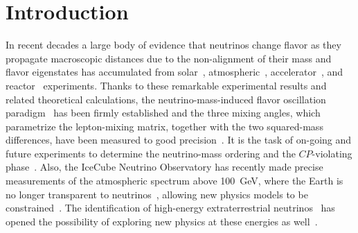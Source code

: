 \documentclass[3p,12pt]{elsarticle}
\newcounter{bla}
\begin{document}
\hypersetup{linkcolor=black}
\tableofcontents
\hypersetup{linkcolor=blue}
\newpage

\ifdefined\manualonly
\else %
\section{Introduction}
\label{sec:intro} 

In recent decades a large body of evidence that neutrinos change
flavor as they propagate macroscopic distances due to the
non-alignment of their mass and flavor eigenstates has accumulated from
solar~\citep{Super-Kamiokande:2010tar, Borexino:2013zhu},
atmospheric~\citep{PhysRevD.91.072004,Super-Kamiokande:2015qek,IceCube:2019dqi,ANTARES:2018rtf},
accelerator~\citep{PhysRevLett.112.181801,
  PhysRevD.93.051104,PhysRevLett.116.151806, PhysRevLett.110.251801}, and
reactor~\citep{An:2013zwz,Abe:2015rcp, Kim:2016yvm} experiments.
Thanks to these remarkable
experimental results and related theoretical calculations, the
  neutrino-mass-induced flavor oscillation paradigm~\citep{Pontecorvo:1967fh,Gribov:1968kq,fukugita2003physics,
  Akhmedov:1999uz,Balantekin:2013kc, GonzalezGarcia:2007ib,Mohapatra:qv, Gouvea:2013fj}
has been firmly established and the three mixing angles, which
parametrize the lepton-mixing matrix, together with the two
squared-mass differences, have been measured to good
precision~\citep{Esteban:2020cvm,deSalas:2017kay,Capozzi:2018ubv,deSalas:2020pgw}. It
is the task of on-going 
and future experiments to determine the neutrino-mass ordering 
and the $CP$-violating phase~\citep{Hewett:2012et,
  Acciarri:2016crz,Aartsen:2014oha, Kouchner:2016pqa,DeRosa:2016ifc}. 
Also, the IceCube Neutrino Observatory has recently made precise measurements of the atmospheric
spectrum above 100~GeV, where the Earth is no longer transparent to
neutrinos~\citep{Donini:2018tsg,Bustamante:2017xuy,IceCube:2020rnc}, allowing new physics
models to be constrained~\citep{Aartsen:2014gkd,TheIceCube:2016oqi}.
The identification of high-energy
extraterrestrial neutrinos~\citep{Aartsen:2014gkd,Aartsen:2015rwa,IceCube:2020wum}
has opened the possibility of exploring new physics at these energies as well~\citep{Arguelles:2015dca, Bustamante:2015waa, Baerwald:2012kc,Arguelles:2019rbn, Esteban:2021tub}. 
\end{document}
